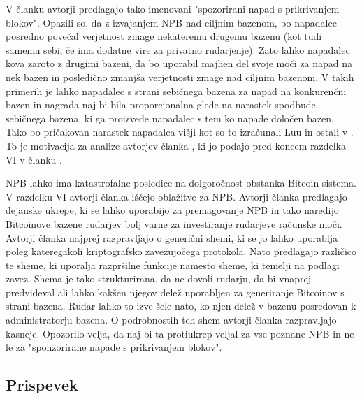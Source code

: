 \documentclass{acm_proc_article-sp}
\begin{document}
V članku \cite{originalarticle} avtorji predlagajo tako imenovani "spozorirani napad s prikrivanjem blokov". Opazili so, da z izvajanjem NPB nad ciljnim bazenom, bo napadalec posredno povečal verjetnost zmage nekateremu drugemu bazenu (kot tudi samemu sebi, če ima dodatne vire za privatno rudarjenje). Zato lahko napadalec kova zaroto z drugimi bazeni, da bo uporabil majhen del svoje moči za napad na nek bazen in posledično zmanjša verjetnosti zmage nad ciljnim bazenom. V takih primerih je lahko napadalec s strani sebičnega bazena za napad na konkurenčni bazen in nagrada naj bi bila proporcionalna glede na narastek spodbude sebičnega bazena, ki ga proizvede napadalec s tem ko napade določen bazen. Tako bo pričakovan narastek napadalca višji kot so to izračunali Luu in ostali v \cite{powersplitting}. To je motivacija za analize avtorjev članka \cite{originalarticle}, ki jo podajo pred koncem razdelka VI v članku \cite{originalarticle}.


NPB lahko ima katastrofalne posledice na dolgoročnost obstanka Bitcoin sistema. V razdelku VI avtorji članka \cite{originalarticle} iščejo oblažitve za NPB. Avtorji članka \cite{originalarticle} predlagajo dejanske ukrepe, ki se lahko uporabijo za premagovanje NPB in tako naredijo Bitcoinove bazene rudarjev bolj varne za investiranje rudarjeve računske moči. Avtorji članka \cite{originalarticle} najprej razpravljajo o generični shemi, ki se jo lahko uporablja poleg kateregakoli kriptografsko zavezujočega protokola. Nato predlagajo različico te sheme, ki uporalja razpršilne funkcije namesto sheme, ki temelji na podlagi zavez. Shema je tako strukturirana, da ne dovoli rudarju, da bi vnaprej predvideval ali lahko kakšen njegov delež uporabljen za generiranje Bitcoinov s strani bazena. Rudar lahko to izve šele nato, ko njen delež v bazenu posredovan k administratorju bazena. O podrobnostih teh shem avtorji članka \cite{originalarticle} razpravljajo kasneje. Opozorilo velja, da naj bi ta protiukrep veljal za vse poznane NPB in ne le za "sponzorirane napade s prikrivanjem blokov".

\subsection{Prispevek}\label{sekcija1b}
\end{document}
